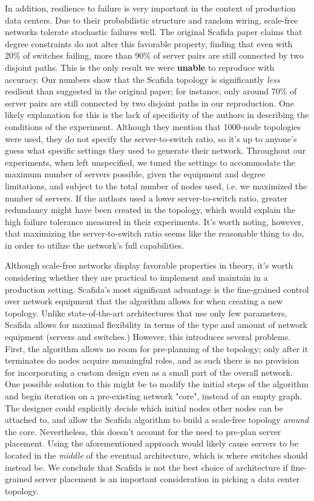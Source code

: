 In addition, resilience to failure is very important in the context of production data centers. Due to their probabilistic structure and random wiring, scale-free networks tolerate stochastic failures well. The original Scafida paper claims that degree constraints do not alter this favorable property, finding that even with 20\% of switches failing, more than 90\% of server pairs are still connected by two disjoint paths. This is the only result we were \textbf{unable} to reproduce with accuracy. Our numbers show that the Scafida topology is significantly \textit{less} resilient than suggested in the original paper; for instance, only around 70\% of server pairs are still connected by two disjoint paths in our reproduction. One likely explanation for this is the lack of specificity of the authors in describing the conditions of the experiment. Although they mention that 1000-node topologies were used, they do not specify the server-to-switch ratio, so it's up to anyone's guess what specific settings they used to generate their network. Throughout our experiments, when left unspecified, we tuned the settings to accommodate the maximum number of servers possible, given the equipment and degree limitations, and subject to the total number of nodes used, i.e. we maximized the number of servers. If the authors used a lower server-to-switch ratio, greater redundancy might have been created in the topology, which would explain the high failure tolerance measured in their experiments. It's worth noting, however, that  maximizing the server-to-switch ratio seems like the reasonable thing to do, in order to utilize the network's full capabilities. 

Although scale-free networks display favorable properties in theory, it's worth considering whether they are practical to implement and maintain in a production setting. Scafida's most significant advantage is the fine-grained control over network equipment that the algorithm allows for when creating a new topology. Unlike state-of-the-art architectures that use only few parameters, Scafida allows for maximal flexibility in terms of the type and amount of network equipment (servers and switches.) However, this introduces several problems. First, the algorithm allows no room for pre-planning of the topology; only after it terminates do nodes acquire meaningful roles, and as such there is no provision for incorporating a custom design even as a small part of the overall network. One possible solution to this might be to modify the initial steps of the algorithm and begin iteration on a pre-existing network "core", instead of an empty graph. The designer could explicitly decide which initial nodes other nodes can be attached to, and allow the Scafida algorithm to build a scale-free topology \textit{around} the core. Nevertheless, this doesn't account for the need to pre-plan server placement. Using the aforementioned approach would likely cause servers to be located in the \textit{middle} of the eventual architecture, which is where switches should instead be. We conclude that Scafida is not the best choice of architecture if fine-grained server placement is an important consideration in picking a data center topology.

